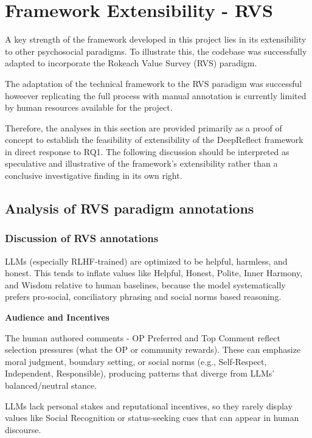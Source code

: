 \section{Framework Extensibility - RVS}
A key strength of the framework developed in this project lies in its extensibility to other psychosocial paradigms. To illustrate this, the codebase was successfully adapted to incorporate the Rokeach Value Survey (RVS) paradigm.

The adaptation of the technical framework to the RVS paradigm was successful howeever replicating the full process with manual annotation is currently limited by human resources available for the project. 

Therefore, the analyses in this section are provided primarily as a proof of concept to establish the feasibility of extensibility of the DeepReflect framework in direct response to RQ1. The following discussion should be interpreted as speculative and illustrative of the framework’s extensibility rather than a conclusive investigative finding in its own right.

\subsection{Analysis of RVS paradigm annotations}

\subsubsection{Discussion of RVS annotations}

LLMs (especially RLHF‑trained) are optimized to be helpful, harmless, and honest. This tends to inflate values like Helpful, Honest, Polite, Inner Harmony, and Wisdom relative to human baselines, because the model systematically prefers pro‑social, conciliatory phrasing and social norms based reasoning.

\textbf{Audience and Incentives}

The human authored comments - OP Preferred and Top Comment reflect selection pressures (what the OP or community rewards). These can emphasize moral judgment, boundary setting, or social norms (e.g., Self‑Respect, Independent, Responsible), producing patterns that diverge from LLMs’ balanced/neutral stance.

LLMs lack personal stakes and reputational incentives, so they rarely display values like Social Recognition or status‑seeking cues that can appear in human discourse.

